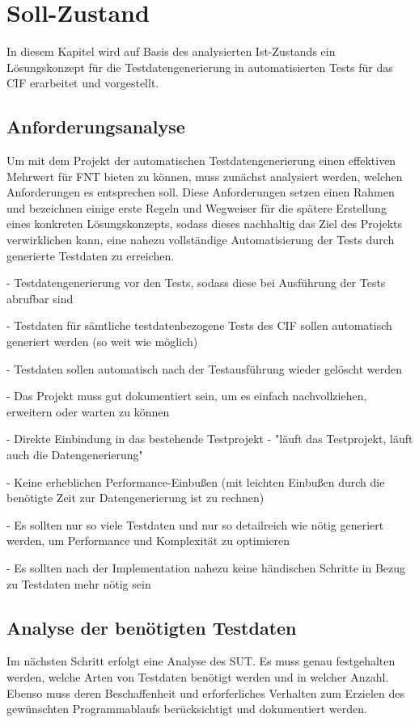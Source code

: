 \chapter{Soll-Zustand}\label{ch:sollzustand}
In diesem Kapitel wird auf Basis des analysierten Ist-Zustands ein Lösungskonzept für die Testdatengenerierung in automatisierten Tests für das \ac{CIF} erarbeitet und vorgestellt.

\section{Anforderungsanalyse}\label{sec:anforderungen}
Um mit dem Projekt der automatischen Testdatengenerierung einen effektiven Mehrwert für FNT bieten zu können, muss zunächst analysiert werden, welchen Anforderungen es entsprechen soll. Diese Anforderungen setzen einen Rahmen und bezeichnen einige erste Regeln und Wegweiser für die spätere Erstellung eines konkreten Lösungskonzepts, sodass dieses nachhaltig das Ziel des Projekts verwirklichen kann, eine nahezu vollständige Automatisierung der Tests durch generierte Testdaten zu erreichen.

- Testdatengenerierung vor den Tests, sodass diese bei Ausführung der Tests abrufbar sind

- Testdaten für sämtliche testdatenbezogene Tests des CIF sollen automatisch generiert werden (so weit wie möglich)

- Testdaten sollen automatisch nach der Testausführung wieder gelöscht werden

- Das Projekt muss gut dokumentiert sein, um es einfach nachvollziehen, erweitern oder warten zu können

- Direkte Einbindung in das bestehende Testprojekt - "läuft das Testprojekt, läuft auch die Datengenerierung"

- Keine erheblichen Performance-Einbußen (mit leichten Einbußen durch die benötigte Zeit zur Datengenerierung ist zu rechnen)

- Es sollten nur so viele Testdaten und nur so detailreich wie nötig generiert werden, um Performance und Komplexität zu optimieren

- Es sollten nach der Implementation nahezu keine händischen Schritte in Bezug zu Testdaten mehr nötig sein

\section{Analyse der benötigten Testdaten}\label{sec:testdatenanalyse}
Im nächsten Schritt erfolgt eine Analyse des \acf{SUT}. Es muss genau festgehalten werden, welche Arten von Testdaten benötigt werden und in welcher Anzahl. Ebenso muss deren Beschaffenheit und erforferliches Verhalten zum Erzielen des gewünschten Programmablaufs berücksichtigt und dokumentiert werden. 

